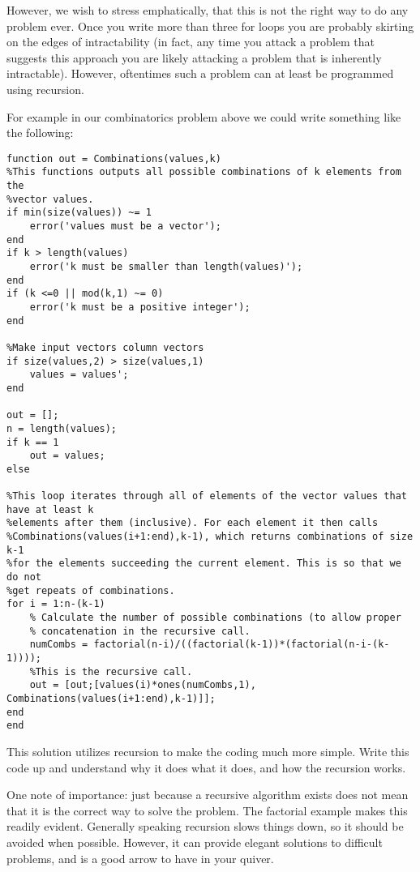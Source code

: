 However, we wish to stress emphatically, that this is not the right way to do any problem ever. Once you write more than three for loops you are probably skirting on the edges of intractability (in fact, any time you attack a problem that suggests this approach you are likely attacking a problem that is inherently intractable). However, oftentimes such a problem can at least be programmed using recursion.

For example in our combinatorics problem above we could write something like the following:

\begin{lstlisting}[style=matlab]
function out = Combinations(values,k)
%This functions outputs all possible combinations of k elements from the
%vector values.
if min(size(values)) ~= 1
    error('values must be a vector');
end
if k > length(values)
    error('k must be smaller than length(values)');
end
if (k <=0 || mod(k,1) ~= 0) 
    error('k must be a positive integer'); 
end

%Make input vectors column vectors
if size(values,2) > size(values,1)
    values = values';
end

out = []; 
n = length(values); 
if k == 1
    out = values; 
else
    
%This loop iterates through all of elements of the vector values that have at least k
%elements after them (inclusive). For each element it then calls
%Combinations(values(i+1:end),k-1), which returns combinations of size k-1
%for the elements succeeding the current element. This is so that we do not
%get repeats of combinations.
for i = 1:n-(k-1)
    % Calculate the number of possible combinations (to allow proper
    % concatenation in the recursive call.
    numCombs = factorial(n-i)/((factorial(k-1))*(factorial(n-i-(k-1))));
    %This is the recursive call.
    out = [out;[values(i)*ones(numCombs,1), Combinations(values(i+1:end),k-1)]];
end
end
\end{lstlisting}

This solution utilizes recursion to make the coding much more simple. Write this code up and understand why it does what it does, and how the recursion works.

One note of importance: just because a recursive algorithm exists does not mean that it is the correct way to solve the problem. The factorial example makes this readily evident. Generally speaking recursion slows things down, so it should be avoided when possible. However, it can provide elegant solutions to difficult problems, and is a good arrow to have in your quiver.

